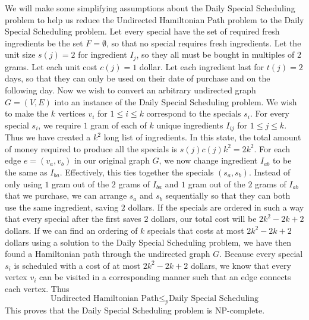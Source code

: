 \documentclass[12pt]{article}
\begin{document}
We will make some simplifying assumptions about the Daily Special Scheduling problem to help us reduce the Undirected Hamiltonian Path problem
to the Daily Special Scheduling problem. Let every special have the set of required fresh ingredients be the set \(F=\emptyset\),
so that no special requires fresh ingredients. Let the unit size \(s(j)=2\) for ingredient \(I_j\), so they all must be bought in multiples
of \(2\) grams. Let each unit cost \(c(j)=1\) dollar. Let each ingredient last for \(t(j)=2\) days, so that they can only be used on their
date of purchase and on the following day. Now we wish to convert an arbitrary undirected graph \(G=(V,E)\) into an instance of the Daily
Special Scheduling problem. We wish to make the \(k\) vertices \(v_i\) for \(1\leq i\leq k\) correspond to the specials \(s_i\). For every
special \(s_i\), we require \(1\) gram of each of \(k\) unique ingredients \(I_{ij}\) for \(1\leq j\leq k\). Thus we have created a \(k^2\) long
list of ingredients. In this state, the total amount of money required to produce all the specials is \(s(j)c(j)k^2=2k^2\). For each edge
\(e=(v_a,v_b)\) in our original graph \(G\), we now change ingredient \(I_{ab}\) to be the same as \(I_{ba}\). Effectively, this ties together
the specials \((s_a,s_b)\). Instead of only using \(1\) gram out of the \(2\) grams of \(I_{ba}\) and \(1\) gram out of the \(2\) grams of \(I_{ab}\) that
we purchase, we can arrange \(s_a\) and \(s_b\) sequentially so that they can both use the same ingredient, saving \(2\) dollars. If the specials
are ordered in such a way that every special after the first saves \(2\) dollars, our total cost will be \(2k^2-2k+2\) dollars. If we can find an
ordering of \(k\) specials that costs at most \(2k^2-2k+2\) dollars using a solution to the Daily Special Scheduling problem, we have then found
a Hamiltonian path through the undirected graph \(G\). Because every special \(s_i\) is scheduled with a cost of at most \(2k^2-2k+2\) dollars,
we know that every vertex \(v_i\) can be visited in a corresponding manner such that an edge connects each vertex. Thus
\[\text{Undirected Hamiltonian Path}\leq_p \text{Daily Special Scheduling}\]
This proves that the Daily Special Scheduling problem is NP-complete.
\end{document}
